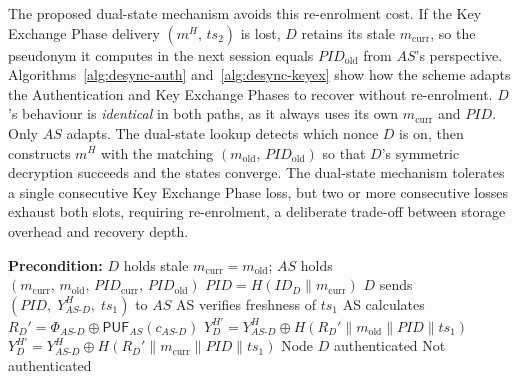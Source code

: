 \documentclass[conference]{IEEEtran}
\begin{document}
The proposed dual-state mechanism avoids this re-enrolment cost.  If the Key
Exchange Phase delivery $(m^H,\,ts_2)$ is lost, $D$ retains its stale
$m_{\mathrm{curr}}$, so the pseudonym it computes in the next session equals
$\mathit{PID}_{\mathrm{old}}$ from $AS$'s perspective.  Algorithms~\ref{alg:desync-auth} and~\ref{alg:desync-keyex}
show how the scheme adapts the Authentication and Key Exchange Phases to recover without re-enrolment.
$D$'s behaviour is \emph{identical} in both paths, as it always uses its own
$m_{\mathrm{curr}}$ and $\mathit{PID}$.  Only $AS$ adapts.  The dual-state
lookup detects which nonce $D$ is on, then constructs $m^H$ with the matching
$(m_{\mathrm{old}},\,\mathit{PID}_{\mathrm{old}})$ so that $D$'s symmetric
decryption succeeds and the states converge.
The dual-state mechanism tolerates a single consecutive Key Exchange Phase loss, but
two or more consecutive losses exhaust both slots, requiring re-enrolment, a
deliberate trade-off between storage overhead and recovery depth.

\begin{algorithm}[t]
\caption{Desynchronisation Recovery -- Authentication Phase}
\label{alg:desync-auth}
\begin{algorithmic}[1]
\Statex \textbf{Precondition:} $D$ holds stale $m_{\mathrm{curr}} = m_{\mathrm{old}}$;\;
       $AS$ holds $(m_{\mathrm{curr}},\,m_{\mathrm{old}},\,
       \mathit{PID}_{\mathrm{curr}},\,\mathit{PID}_{\mathrm{old}})$
\State $\mathit{PID} = H(\mathit{ID}_D \| m_{\mathrm{curr}})$
\State $D$ sends $(\mathit{PID},\; Y_{AS\text{-}D}^H,\; ts_1)$ to $AS$
\State AS verifies freshness of $ts_1$
\State AS calculates $R_D' = \Phi_{AS\text{-}D} \oplus \mathsf{PUF}_{AS}(c_{AS\text{-}D})$
    \State $Y_D^{H'} = Y_{AS\text{-}D}^H \oplus
           H(R_D' \| m_{\mathrm{old}} \| \mathit{PID} \| ts_1)$
\EndIf
{}
    \State $Y_D^{H'} = Y_{AS\text{-}D}^H \oplus
           H(R_D' \| m_{\mathrm{curr}} \| \mathit{PID} \| ts_1)$
\EndIf
{}
    \State Node $D$ authenticated
\Else
    \State Not authenticated
\EndIf
\end{algorithmic}
\end{algorithm}
\end{document}
